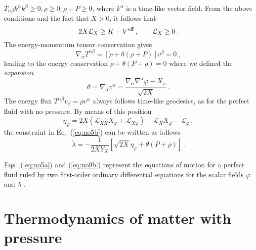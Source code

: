 \documentclass[twocolumn,showpacs, nofootinbib,aps,superscriptaddress, eqsecnum,prd,prl,notitlepage,showkeys,10pt,reprint]{revtex4-1}
\begin{document}
$T_{\alpha\beta}k^\alpha k^\beta \geq0, \rho \geq 0, \rho + P \geq 0$,
where $k^\alpha$ is a time-like vector field.
From the above conditions and the fact that $X>0$, it follows that
%
\begin{equation}
\label{weaks}
2X\mathcal{L}_X \geq K - V^{\rm eff}\,,\qquad \mathcal{L}_X \geq 0\,.
\end{equation}
%
The energy-momentum tensor conservation gives
%
\begin{equation}
\label{eq:no13}
\nabla_\alpha T^{\alpha\beta} = \left[\dot{\rho} + \theta \left(\rho + P\right) \right] v^\beta = 0\ ,
\end{equation}
%
leading to the energy conservation $
\dot{\rho} + \theta\left(P + \rho \right) = 0$ where we defined the \textit{expansion}
%
\begin{equation}
\label{eq:no15}
\theta = \nabla_\alpha v^\alpha = \frac{\nabla_\alpha\nabla^\alpha \varphi-X_\varphi}{\sqrt{2X}}\,.
\end{equation}
%
The energy flux $T^{\alpha\beta}v_\beta=\rho v^\alpha$ always follows time-like geodesics, as for the perfect fluid with no pressure. By means of this position
%
\begin{equation}
\label{eq:no16}
\eta_\varphi =
2X \left(\mathcal{L}_{XX} X_\varphi + \mathcal{L}_{X\varphi} \right) + \mathcal{L}_X X_\varphi -\mathcal{L}_\varphi\,,
\end{equation}
%
the constraint in Eq.~(\ref{eq:no5b}) can be written as follows
%
\begin{equation}
\label{eq:no9b}
\dot{\lambda} = -\frac{1}{2X Y_X} \left[\sqrt{2X}\eta_\varphi + \theta\left(P + \rho \right) \right] \,.
\end{equation}

\noindent Eqs.~(\ref{eq:no5a}) and (\ref{eq:no9b}) represent the equations of motion for a perfect fluid ruled by two first-order ordinary differential equations for the scalar fields $\varphi$ and $\lambda$ \cite{LSV10}.


\section{Thermodynamics of matter with pressure}
\label{sec:thermodynamics}
\end{document}
